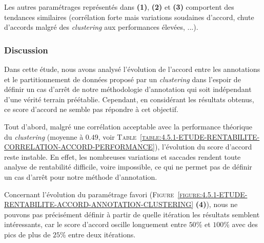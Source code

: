 			Les autres paramétrages représentés dans \textbf{(1)}, \textbf{(2)} et \textbf{(3)} comportent des tendances similaires (corrélation forte mais variations soudaines d'accord, chute d'accords malgré des \textit{clustering} aux performances élevées, ...).

		\subsubsection{Discussion}
		
			Dans cette étude, nous avons analysé l'évolution de l'accord entre les annotations et le partitionnement de données proposé par un \textit{clustering} dans l'espoir de définir un cas d'arrêt de notre méthodologie d'annotation qui soit indépendant d'une vérité terrain préétablie.
			Cependant, en considérant les résultats obtenus, ce score d'accord ne semble pas répondre à cet objectif.
			
			Tout d'abord, malgré une corrélation acceptable avec la performance théorique du \textit{clustering} (moyenne à $0.49$, voir \textsc{Table~\ref{table:4.5.1-ETUDE-RENTABILITE-CORRELATION-ACCORD-PERFORMANCE}}), l'évolution du score d'accord reste instable.
			En effet, les nombreuses variations et saccades rendent toute analyse de rentabilité difficile, voire impossible, ce qui ne permet pas de définir un cas d'arrêt pour notre méthode d'annotation.
			
			\begin{leftBarExamples}
				Concernant l'évolution du paramétrage favori (\textsc{Figure~\ref{figure:4.5.1-ETUDE-RENTABILITE-ACCORD-ANNOTATION-CLUSTERING}} \textbf{(4)}), nous ne pouvons pas précisément définir à partir de quelle itération les résultats semblent intéressants, car le score d'accord oscille longuement entre $50$\% et $100$\% avec des pics de plus de $25$\% entre deux itérations. 
			\end{leftBarExamples}
			
